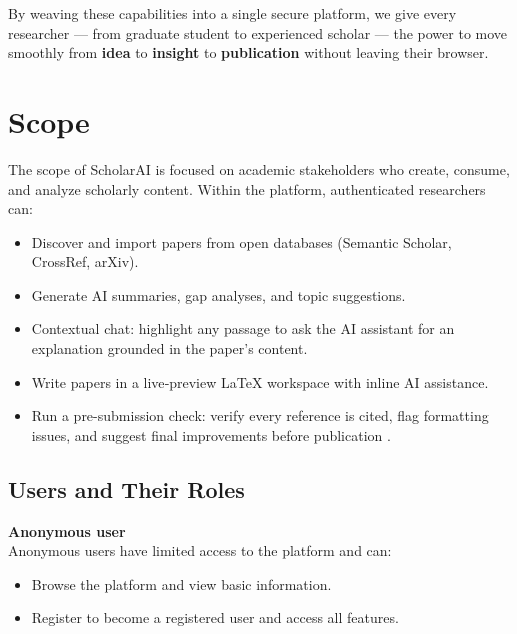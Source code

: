 \documentclass[11pt]{article}
\begin{document}
By weaving these capabilities into a single secure platform, we give every researcher — from graduate student to experienced scholar — the power to move smoothly from \textbf{idea} to \textbf{insight} to \textbf{publication} without leaving their browser.

\vspace{1.2em}
\section*{Scope}

\justifying
The scope of ScholarAI is focused on academic stakeholders who create, consume, and analyze scholarly content. Within the platform, authenticated researchers can:

\begin{itemize}
    \item Discover and import papers from open databases (Semantic Scholar, CrossRef, arXiv).
    \item Generate AI summaries, gap analyses, and topic suggestions.
    \item Contextual chat: highlight any passage to ask the AI assistant for an explanation grounded in the paper’s content. 
    \item     Write papers in a live‑preview \LaTeX{} workspace with inline AI assistance.
    \item Run a pre-submission check: verify every reference is cited, flag formatting issues, and suggest final improvements before publication .
\end{itemize}

\vspace{1.2em}
\subsection*{Users and Their Roles}

\noindent\textbf{Anonymous user} \\
Anonymous users have limited access to the platform and can:
\begin{itemize}[noitemsep, leftmargin=*]
    \item Browse the platform and view basic information.
    \item Register to become a registered user and access all features.
\end{itemize}
\end{document}
